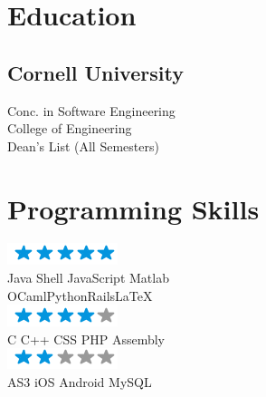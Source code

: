 \documentclass[]{uniqueness_cv}
\begin{document}
\begin{minipage}[t]{0.33\textwidth} 


\section{ \textcolor{gray}{} Education} 

\subsection{Cornell University}
\sectionsep


Conc. in Software Engineering \\
College of Engineering \\
Dean's List (All Semesters) \\
\sectionsep


\section{ \textcolor{gray}{} Programming Skills}
\includegraphics[scale=0.80]{img/5stars.png}\\
Java \textbullet{}   Shell \textbullet{} JavaScript \textbullet{} Matlab \\
OCaml\textbullet{}Python\textbullet{}Rails\textbullet{}\LaTeX\ \\
\includegraphics[scale=0.80]{img/4stars.png}\\
C \textbullet{} C++ \textbullet{} CSS \textbullet{} PHP \textbullet{} Assembly \\
\includegraphics[scale=0.80]{img/2stars.png}\\
AS3 \textbullet{} iOS \textbullet{} Android \textbullet{} MySQL
\sectionsep


\end{minipage}
\end{document}
